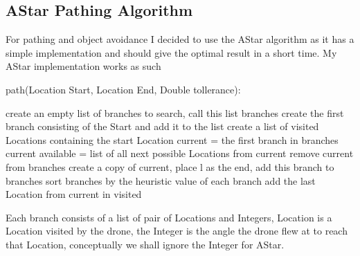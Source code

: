 \documentclass[12pt]{article}
\begin{document}
\subsection{AStar Pathing Algorithm}
For pathing and object avoidance I decided to use the AStar algorithm as it has a simple implementation and should give the optimal result in a short time. My AStar implementation works as such
\begin{algorithm}
 \caption{path(Location Start, Location End, Double tollerance):}
 \begin{algorithmic}[1]
  \STATE create an empty list of branches to search, call this list branches
  \STATE create the first branch consisting of the Start and add it to the list
  \STATE create a list of visited Locations containing the start Location
  \STATE current = the first branch in branches
  \RETURN current
  \ENDIF
  \STATE available = list of all next possible Locations from current
  \STATE remove current from branches
  \STATE create a copy of current, place l as the end, add this branch to branches
  \ENDIF
  \ENDFOR
  \STATE sort branches by the heuristic value of each branch
  \STATE add the last Location from current in visited
  \ENDWHILE
 \end{algorithmic}
\end{algorithm}
Each branch consists of a list of pair of Locations and Integers, Location is a Location visited by the drone, the Integer is the angle the drone flew at to reach that Location, conceptually we shall ignore the Integer for AStar.
\end{document}

